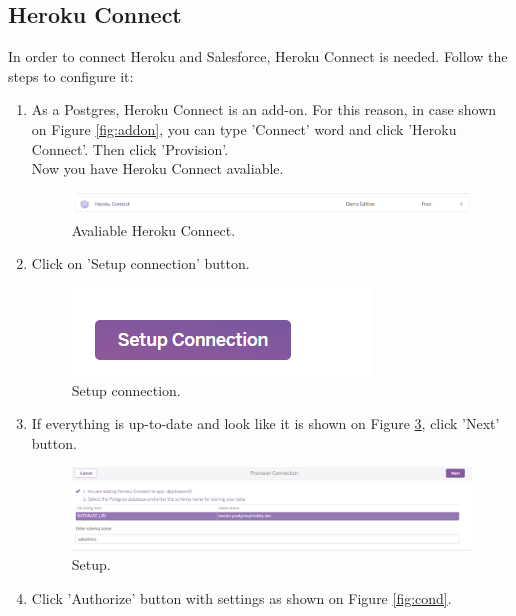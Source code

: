 \documentclass[12pt,a4paper]{article}
\begin{document}
\subsection{Heroku Connect}
In order to connect Heroku and Salesforce, Heroku Connect is needed. Follow the steps to configure it:
\begin{enumerate}
	
 \item As a Postgres, Heroku Connect is an add-on. For this reason, in case shown on Figure \ref{fig:addon}, you can type 'Connect' word and click 'Heroku Connect'. Then click 'Provision'.\\
Now you have Heroku Connect avaliable.
\begin{figure}[H]
	\centering
	\includegraphics[width=1\textwidth]{images/connect1.PNG}
	\caption{Avaliable Heroku Connect.}
	\label{fig:cona}
\end{figure}

\item Click on 'Setup connection' button.
\begin{figure}[H]
	\centering
	\includegraphics{images/connect2.PNG}
	\caption{Setup connection.}
	\label{fig:conb}
\end{figure}

\item If everything is up-to-date and look like it is shown on Figure \ref{fig:conc}, click 'Next' button.

\begin{figure}[H]
	\centering
	\includegraphics[width=1\textwidth]{images/connect3.PNG}
	\caption{Setup.}
	\label{fig:conc}
\end{figure}

\item Click 'Authorize' button with settings as shown on Figure \ref{fig:cond}.


\end{enumerate}
\end{document}
